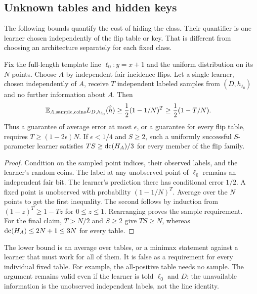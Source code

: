\subsection{Unknown tables and hidden keys}\label{sec:secret}
The following bounds quantify the cost of hiding the class. Their quantifier is one learner chosen independently of the flip table or key. That is different from choosing an architecture separately for each fixed class.

\begin{samepage}
\begin{proposition}\label{prop:unseen}
Fix the full-length template line $\ell_0:y=x+1$ and the uniform distribution on its $N$ points. Choose $A$ by independent fair incidence flips. Let a single learner, chosen independently of $A$, receive $T$ independent labeled samples from $(D,h_{\ell_0})$ and no further information about $A$. Then
\[
 \mathbb E_{A,\mathrm{sample},\mathrm{coins}}L_{D,h_{\ell_0}}(\widehat h)
 \ge\frac12(1-1/N)^T
 \ge\frac12(1-T/N).
\]
Thus a guarantee of average error at most $\epsilon$, or a guarantee for every flip table, requires $T\ge(1-2\epsilon)N$. If $\epsilon<1/4$ and $S\ge2$, such a uniformly successful $S$-parameter learner satisfies $TS\ge\operatorname{dc}(H_A)/3$ for every member of the flip family.
\end{proposition}
\end{samepage}
\begin{proof}
Condition on the sampled point indices, their observed labels, and the learner's random coins. The label at any unobserved point of $\ell_0$ remains an independent fair bit. The learner's prediction there has conditional error $1/2$. A fixed point is unobserved with probability $(1-1/N)^T$. Average over the $N$ points to get the first inequality. The second follows by induction from $(1-z)^T\ge1-Tz$ for $0\le z\le1$. Rearranging proves the sample requirement. For the final claim, $T>N/2$ and $S\ge2$ give $TS\ge N$, whereas $\operatorname{dc}(H_A)\le2N+1\le3N$ for every table.
\end{proof}

The lower bound is an average over tables, or a minimax statement against a learner that must work for all of them. It is false as a requirement for every individual fixed table. For example, the all-positive table needs no sample. The argument remains valid even if the learner is told $\ell_0$ and $D$: the unavailable information is the unobserved independent labels, not the line identity.

